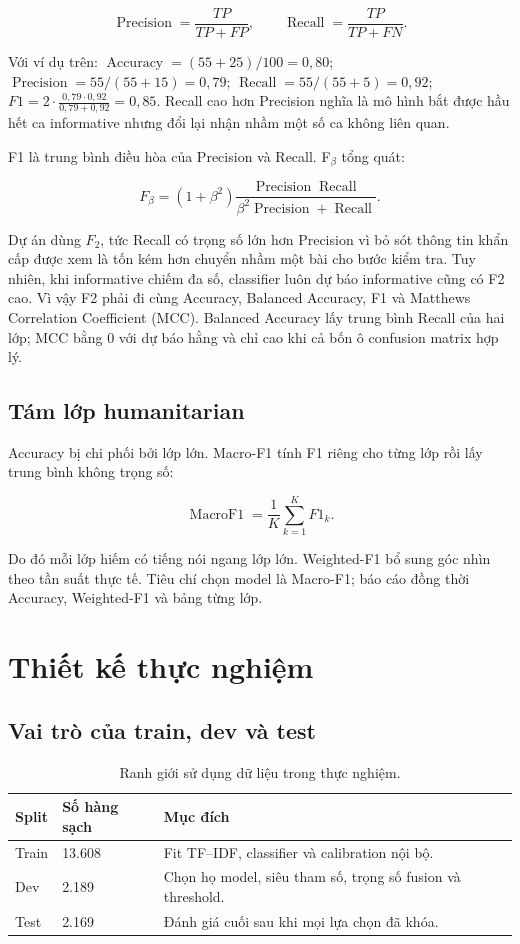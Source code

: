 \[
\operatorname{Precision}=\frac{TP}{TP+FP},\qquad
\operatorname{Recall}=\frac{TP}{TP+FN}.
\]

Với ví dụ trên: \(\operatorname{Accuracy}=(55+25)/100=0{,}80\);
\(\operatorname{Precision}=55/(55+15)=0{,}79\);
\(\operatorname{Recall}=55/(55+5)=0{,}92\);
\(F1=2\cdot\frac{0{,}79\cdot0{,}92}{0{,}79+0{,}92}=0{,}85\). Recall cao hơn
Precision nghĩa là mô hình bắt được hầu hết ca informative nhưng đổi lại nhận
nhầm một số ca không liên quan.

F1 là trung bình điều hòa của Precision và Recall. F\(_\beta\) tổng quát:

\[
F_\beta=(1+\beta^2)
\frac{\operatorname{Precision}\operatorname{Recall}}
{\beta^2\operatorname{Precision}+\operatorname{Recall}}.
\]

Dự án dùng \(F_2\), tức Recall có trọng số lớn hơn Precision vì bỏ sót thông tin
khẩn cấp được xem là tốn kém hơn chuyển nhầm một bài cho bước kiểm tra. Tuy
nhiên, khi informative chiếm đa số, classifier luôn dự báo informative cũng có
F2 cao. Vì vậy F2 phải đi cùng Accuracy, Balanced Accuracy, F1 và Matthews
Correlation Coefficient (MCC). Balanced Accuracy lấy trung bình Recall của hai
lớp; MCC bằng 0 với dự báo hằng và chỉ cao khi cả bốn ô confusion matrix hợp lý.

\subsection{Tám lớp humanitarian}

Accuracy bị chi phối bởi lớp lớn. Macro-F1 tính F1 riêng cho từng lớp rồi lấy
trung bình không trọng số:

\[
\operatorname{MacroF1}=\frac{1}{K}\sum_{k=1}^{K}F1_k.
\]

Do đó mỗi lớp hiếm có tiếng nói ngang lớp lớn. Weighted-F1 bổ sung góc nhìn theo
tần suất thực tế. Tiêu chí chọn model là Macro-F1; báo cáo đồng thời Accuracy,
Weighted-F1 và bảng từng lớp.

\section{Thiết kế thực nghiệm}

\subsection{Vai trò của train, dev và test}

\begin{table}[H]\centering
\caption{Ranh giới sử dụng dữ liệu trong thực nghiệm.}
\begin{tabularx}{\textwidth}{p{2.2cm}p{2.4cm}X}
\toprule
\textbf{Split} & \textbf{Số hàng sạch} & \textbf{Mục đích}\\
\midrule
Train & 13.608 & Fit TF--IDF, classifier và calibration nội bộ.\\
Dev & 2.189 & Chọn họ model, siêu tham số, trọng số fusion và threshold.\\
Test & 2.169 & Đánh giá cuối sau khi mọi lựa chọn đã khóa.\\
\bottomrule
\end{tabularx}
\end{table}

